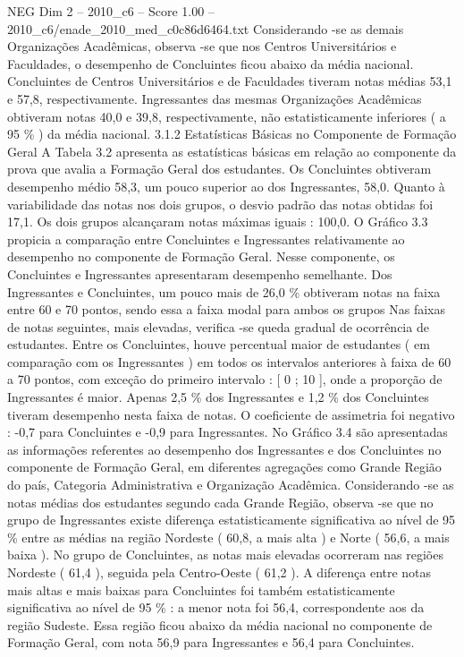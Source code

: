 \begin{textsample}{NEG Dim 2 – 2010\_c6 – Score 1.00 – 2010\_c6/enade\_2010\_med\_c0c86d6464.txt}
Considerando -se as demais Organizações Acadêmicas, observa -se que nos Centros Universitários e Faculdades, o desempenho de Concluintes ficou abaixo da média nacional.
Concluintes de Centros Universitários e de Faculdades tiveram notas médias 53,1 e 57,8, respectivamente.
Ingressantes das mesmas Organizações Acadêmicas obtiveram notas 40,0 e 39,8, respectivamente, não estatisticamente inferiores ( a 95 \% ) da média nacional. 3.1.2 Estatísticas Básicas no Componente de Formação Geral A Tabela 3.2 apresenta as estatísticas básicas em relação ao componente da prova que avalia a Formação Geral dos estudantes.
Os Concluintes obtiveram desempenho médio 58,3, um pouco superior ao dos Ingressantes, 58,0.
Quanto à variabilidade das notas nos dois grupos, o desvio padrão das notas obtidas foi 17,1.
Os dois grupos alcançaram notas máximas iguais : 100,0.
O Gráfico 3.3 propicia a comparação entre Concluintes e Ingressantes relativamente ao desempenho no componente de Formação Geral.
Nesse componente, os Concluintes e Ingressantes apresentaram desempenho semelhante.
Dos Ingressantes e Concluintes, um pouco mais de 26,0 \% obtiveram notas na faixa entre 60 e 70 pontos, sendo essa a faixa modal para ambos os grupos Nas faixas de notas seguintes, mais elevadas, verifica -se queda gradual de ocorrência de estudantes.
Entre os Concluintes, houve percentual maior de estudantes ( em comparação com os Ingressantes ) em todos os intervalos anteriores à faixa de 60 a 70 pontos, com exceção do primeiro intervalo : [ 0 ; 10 ], onde a proporção de Ingressantes é maior.
Apenas 2,5 \% dos Ingressantes e 1,2 \% dos Concluintes tiveram desempenho nesta faixa de notas.
O coeficiente de assimetria foi negativo : -0,7 para Concluintes e -0,9 para Ingressantes.
No Gráfico 3.4 são apresentadas as informações referentes ao desempenho dos Ingressantes e dos Concluintes no componente de Formação Geral, em diferentes agregações como Grande Região do país, Categoria Administrativa e Organização Acadêmica.
Considerando -se as notas médias dos estudantes segundo cada Grande Região, observa -se que no grupo de Ingressantes existe diferença estatisticamente significativa ao nível de 95 \% entre as médias na região Nordeste ( 60,8, a mais alta ) e Norte ( 56,6, a mais baixa ).
No grupo de Concluintes, as notas mais elevadas ocorreram nas regiões Nordeste ( 61,4 ), seguida pela Centro-Oeste ( 61,2 ).
A diferença entre notas mais altas e mais baixas para Concluintes foi também estatisticamente significativa ao nível de 95 \% : a menor nota foi 56,4, correspondente aos da região Sudeste.
Essa região ficou abaixo da média nacional no componente de Formação Geral, com nota 56,9 para Ingressantes e 56,4 para Concluintes.

\end{textsample}
